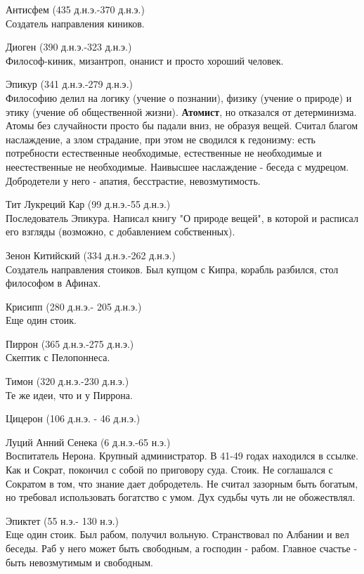 \documentclass[12pt,a4paper]{article}
\begin{document}
Антисфем (435 д.н.э.-370 д.н.э.)\\
Создатель направления киников.

Диоген (390 д.н.э.-323 д.н.э.)\\ 
Философ-киник, мизантроп, онанист и просто хороший человек.

Эпикур (341 д.н.э.-279 д.н.э.)\\
Философию делил на логику (учение о познании), физику (учение о природе) и этику (учение об общественной жизни). \textbf{Атомист}, но отказался от детерминизма. Атомы без случайности просто бы падали вниз, не образуя вещей. Считал благом наслаждение, а злом страдание, при этом не сводился к гедонизму: есть потребности естественные необходимые, естественные не необходимые и неестественные не необходимые. Наивысшее наслаждение - беседа с мудрецом. Добродетели у него - апатия, бесстрастие, невозмутимость.

Тит Лукреций Кар (99 д.н.э.-55 д.н.э.)\\
Последователь Эпикура. Написал книгу "О природе вещей", в которой и расписал его взгляды (возможно, с добавлением собственных).

Зенон Китийский (334 д.н.э.-262 д.н.э.)\\ 
Создатель направления стоиков. Был купцом с Кипра, корабль разбился, стол философом в Афинах. 

Крисипп (280 д.н.э.- 205 д.н.э.)\\
Еще один стоик.

Пиррон (365 д.н.э.-275 д.н.э.)\\ 
Скептик с Пелопоннеса.

Тимон (320 д.н.э.-230 д.н.э.)\\
Те же идеи, что и у Пиррона.

Цицерон (106 д.н.э. - 46 д.н.э.)

Луций Анний Сенека  (6 д.н.э.-65 н.э.)\\
Воспитатель Нерона. Крупный администратор. В 41-49 годах находился в ссылке. Как и Сократ, покончил с собой по приговору суда. Стоик. Не соглашался с Сократом в том, что знание дает добродетель. Не считал зазорным быть богатым, но требовал использовать богатство с умом. Дух судьбы чуть ли не обожествлял.

Эпиктет (55 н.э.- 130 н.э.)\\
Еще один стоик. Был рабом, получил вольную. Странствовал по Албании и вел беседы. Раб у него может быть свободным, а господин - рабом. Главное счастье - быть невозмутимым и свободным.
\end{document}
